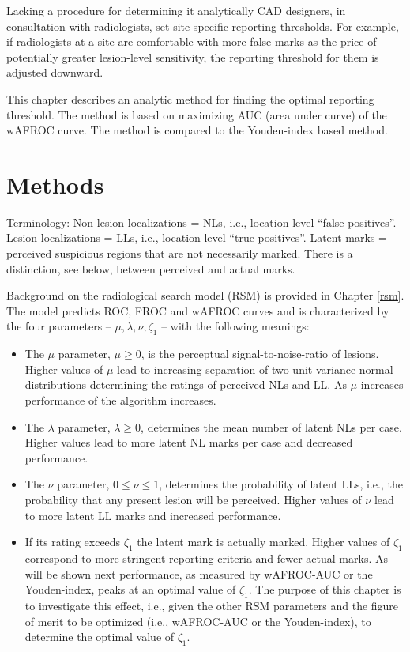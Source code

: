 \documentclass[
]{book}
\begin{document}
Lacking a procedure for determining it analytically CAD designers, in consultation with radiologists, set site-specific reporting thresholds. For example, if radiologists at a site are comfortable with more false marks as the price of potentially greater lesion-level sensitivity, the reporting threshold for them is adjusted downward.

This chapter describes an analytic method for finding the optimal reporting threshold. The method is based on maximizing AUC (area under curve) of the wAFROC curve. The method is compared to the Youden-index based method.

\hypertarget{optim-op-point-methods}{%
\section{Methods}\label{optim-op-point-methods}}

Terminology:
Non-lesion localizations = NLs, i.e., location level ``false positives''.
Lesion localizations = LLs, i.e., location level ``true positives''.
Latent marks = perceived suspicious regions that are not necessarily marked. There is a distinction, see below, between perceived and actual marks.

Background on the radiological search model (RSM) is provided in Chapter \ref{rsm}. The model predicts ROC, FROC and wAFROC curves and is characterized by the four parameters -- \(\mu, \lambda, \nu, \zeta_1\) -- with the following meanings:

\begin{itemize}
\item
  The \(\mu\) parameter, \(\mu \ge 0\), is the perceptual signal-to-noise-ratio of lesions. Higher values of \(\mu\) lead to increasing separation of two unit variance normal distributions determining the ratings of perceived NLs and LL. As \(\mu\) increases performance of the algorithm increases.
\item
  The \(\lambda\) parameter, \(\lambda \ge 0\), determines the mean number of latent NLs per case. Higher values lead to more latent NL marks per case and decreased performance.
\item
  The \(\nu\) parameter, \(0 \le \nu \le 1\), determines the probability of latent LLs, i.e., the probability that any present lesion will be perceived. Higher values of \(\nu\) lead to more latent LL marks and increased performance.
\item
  If its rating exceeds \(\zeta_1\) the latent mark is actually marked. Higher values of \(\zeta_1\) correspond to more stringent reporting criteria and fewer actual marks. As will be shown next performance, as measured by wAFROC-AUC or the Youden-index, peaks at an optimal value of \(\zeta_1\). The purpose of this chapter is to investigate this effect, i.e., given the other RSM parameters and the figure of merit to be optimized (i.e., wAFROC-AUC or the Youden-index), to determine the optimal value of \(\zeta_1\).
\end{itemize}
\end{document}
